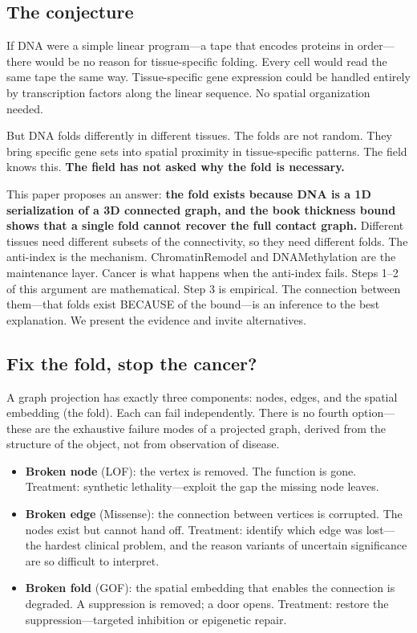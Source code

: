 \documentclass[11pt]{article}
\theoremstyle{definition}
\begin{document}
\subsection{The conjecture}

If DNA were a simple linear program---a tape that encodes proteins in order---there would be no reason for tissue-specific folding. Every cell would read the same tape the same way. Tissue-specific gene expression could be handled entirely by transcription factors along the linear sequence. No spatial organization needed.

But DNA folds differently in different tissues. The folds are not random. They bring specific gene sets into spatial proximity in tissue-specific patterns. The field knows this. \textbf{The field has not asked why the fold is necessary.}

This paper proposes an answer: \textbf{the fold exists because DNA is a 1D serialization of a 3D connected graph, and the book thickness bound shows that a single fold cannot recover the full contact graph.} Different tissues need different subsets of the connectivity, so they need different folds. The anti-index is the mechanism. ChromatinRemodel and DNAMethylation are the maintenance layer. Cancer is what happens when the anti-index fails. Steps 1--2 of this argument are mathematical. Step 3 is empirical. The connection between them---that folds exist BECAUSE of the bound---is an inference to the best explanation. We present the evidence and invite alternatives.

\subsection{Fix the fold, stop the cancer?}

A graph projection has exactly three components: nodes, edges, and the spatial embedding (the fold). Each can fail independently. There is no fourth option---these are the exhaustive failure modes of a projected graph, derived from the structure of the object, not from observation of disease.

\begin{itemize}[nosep]
\item \textbf{Broken node} (LOF): the vertex is removed. The function is gone. Treatment: synthetic lethality---exploit the gap the missing node leaves.
\item \textbf{Broken edge} (Missense): the connection between vertices is corrupted. The nodes exist but cannot hand off. Treatment: identify which edge was lost---the hardest clinical problem, and the reason variants of uncertain significance are so difficult to interpret.
\item \textbf{Broken fold} (GOF): the spatial embedding that enables the connection is degraded. A suppression is removed; a door opens. Treatment: restore the suppression---targeted inhibition or epigenetic repair.
\end{itemize}
\end{document}
